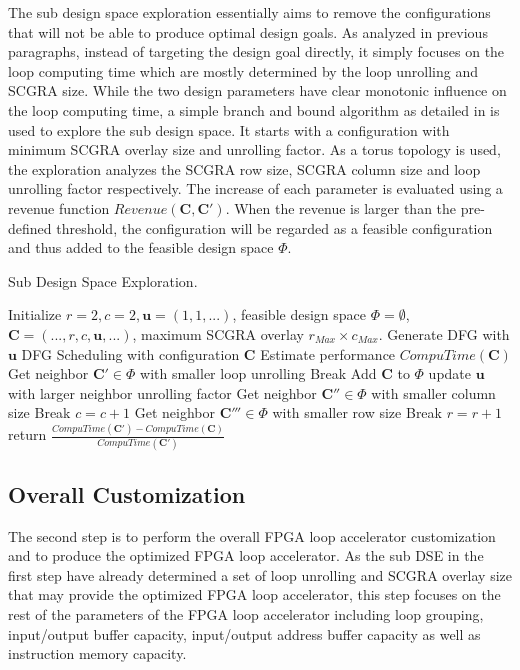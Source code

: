 The sub design space exploration essentially aims to remove the configurations that will not be able to produce optimal design goals. As analyzed in previous paragraphs, instead of targeting the design goal directly, it simply focuses on the loop computing time which are mostly determined by the loop unrolling and SCGRA size. While the two design parameters have clear monotonic influence on the loop computing time, a simple branch and bound algorithm as detailed in  is used to explore the sub design space. It starts with a configuration with minimum SCGRA overlay size and unrolling factor. As a torus topology is used, the exploration analyzes the SCGRA row size, SCGRA column size and loop unrolling factor respectively. The increase of each parameter is evaluated using a revenue function $Revenue(\bm{C}, \bm{C'})$. When the revenue is larger than the pre-defined threshold, the configuration will be regarded as a feasible configuration and thus added to the feasible design space $\Phi$. 

\begin{algorithm}[hp]
\caption{Sub Design Space Exploration.}
\label{alg:revenuealg}
\begin{algorithmic}
\PROCEDURE{}
\STATE Initialize $r=2, c=2, \bm{u}=(1,1,...)$, feasible design space $\Phi=\emptyset$,
$\bm{C}=(...,r,c,\bm{u},...)$, maximum SCGRA overlay $r_{Max}\times c_{Max}$.
\STATE Generate DFG with $\bm{u}$
\STATE DFG Scheduling with configuration $\bm{C}$
\STATE Estimate performance $CompuTime(\bm{C})$
\STATE Get neighbor $\bm{C'} \in \Phi$ with smaller loop unrolling
\STATE Break
\ELSE 
\STATE Add $\bm{C}$ to $\Phi$
\ENDIF
\STATE update $\bm{u}$ with larger neighbor unrolling factor
\ENDWHILE
\STATE Get neighbor $\bm{C''} \in \Phi$ with smaller column size
\STATE Break
\ENDIF
\STATE $c=c+1$
\ENDWHILE
\STATE Get neighbor $\bm{C'''} \in \Phi$ with smaller row size
\STATE Break
\ENDIF
\STATE $r=r+1$
\ENDWHILE
\ENDPROCEDURE
\STATE
{}
\STATE return $\frac{CompuTime(\bm{C'})-CompuTime(\bm{C})}{CompuTime(\bm{C'})}$ 
\ENDPROCEDURE
\end{algorithmic}
\end{algorithm}

\subsection{Overall Customization}
The second step is to perform the overall FPGA loop accelerator customization and to produce the optimized FPGA loop accelerator. As the sub DSE in the first step have already determined a set of loop unrolling and SCGRA overlay size that may provide the optimized FPGA loop accelerator, this step focuses on the rest of the parameters of the FPGA loop accelerator including loop grouping, input/output buffer capacity, input/output address buffer capacity as well as instruction memory capacity. 

